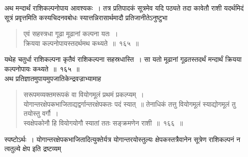 \documentclass[11pt, openany]{book}
\begin{document}
\vspace{-2mm}
 अथ मन्दार्थं राशिकल्पनोपाय आवश्यकः~। तत्र प्रतिपादकं सूत्रमेव यदि
पठ्यते तदा कावेतौ राशी यदर्थमिदं सूत्रं प्रवृत्तमिति कस्यचिदनवबोधः
स्यात्तन्निरासार्थमादौ प्रतिजानीतेऽनुष्टुभा\textendash
\begin{quote}
    \ab 
     एवं सहस्त्रधा गूढा मूढानां कल्पना यतः~।\\
 क्रियया कल्पनोपायस्तदर्थमथ कथ्यते~॥~१६५~॥~
\end{quote}
 
 यथेह चतुर्धा राशिकल्पना कृतैवं राशिकल्पना सहस्रधास्ति~। सा यतो
मूढानां गूढतस्तदर्थं मन्दार्थं क्रियया कल्पनोपायः कथ्यते~॥~१६५~॥~\\

\vspace{-2mm}
अथ प्रतिज्ञातमुपायमुपजातिकेन्द्रवज्राभ्यामाह\textendash

 \label{166}
\begin{quote}
    \ab 
     सरूपमव्यक्तमरूपकं वा वियोगमूलं प्रथमं प्रकल्प्यम्~।\\
 योगान्तरक्षेपकभाजिताद्यद्वर्गान्तरक्षेपकतः पदं स्यात्~॥
\newpage
  तेनाधिकं तत्तु वियोगमूलं स्याद्योगमूलं तु तयोस्तु वर्गौ~।\\
 स्वक्षेपकोनौ हि वियोगयोगौ स्यातां ततः सङ्क्रमणेन राशी~॥~१६६~॥~
\end{quote}

 स्पष्टोऽर्थः~। योगान्तरक्षेपकभाजितादित्युक्तेर्यत्र योगान्तरयोस्तुल्यः
क्षेपकस्तत्रैवानेन
सूत्रेण राशिकल्पनं न त्वतुल्ये क्षेप इति द्रष्टव्यम्\textendash\\
\end{document}
